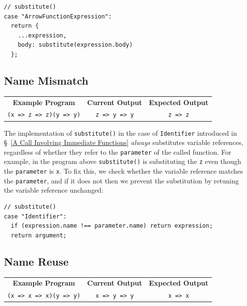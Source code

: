 \documentclass[12pt, oneside]{book}
\begin{document}
\begin{verbatim}
// substitute()
case "ArrowFunctionExpression":
  return {
    ...expression,
    body: substitute(expression.body)
  };
\end{verbatim}

\subsection{Name Mismatch}

\begin{center}
\begin{tabular}{c|c|c}
\textbf{Example Program} & \textbf{Current Output} & \textbf{Expected Output} \\
\texttt{(x => z => z)(y => y)} & \texttt{z => y => y} & \texttt{z => z} \\
\end{tabular}
\end{center}

The implementation of \texttt{substitute()} in the case of \texttt{Identifier} introduced in §~\ref{A Call Involving Immediate Functions} \emph{always} substitutes variable references, regardless of whether they refer to the \texttt{parameter} of the called function. For example, in the program above \texttt{substitute()} is substituting the \texttt{z} even though the \texttt{parameter} is \texttt{x}. To fix this, we check whether the variable reference matches the \texttt{parameter}, and if it does not then we prevent the substitution by retuning the variable reference unchanged:

\begin{verbatim}
// substitute()
case "Identifier":
  if (expression.name !== parameter.name) return expression;
  return argument;
\end{verbatim}

\subsection{Name Reuse}
\label{Step 0: Name Reuse}

\begin{center}
\begin{tabular}{c|c|c}
\textbf{Example Program} & \textbf{Current Output} & \textbf{Expected Output} \\
\texttt{(x => x => x)(y => y)} & \texttt{x => y => y} & \texttt{x => x} \\
\end{tabular}
\end{center}
\end{document}
